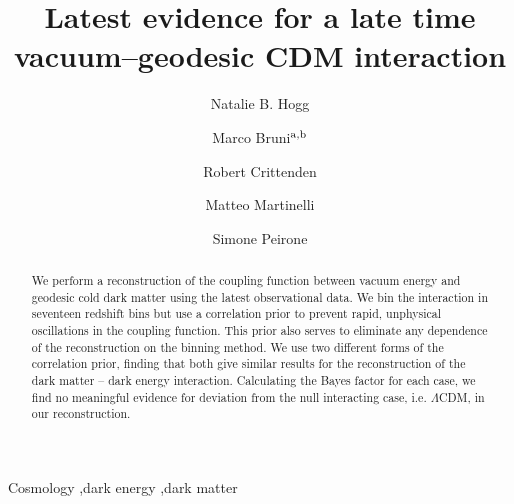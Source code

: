 \documentclass[final,3p,times,twocolumn]{elsarticle}
\begin{document}
\begin{frontmatter}

\title{Latest evidence for a late time vacuum--geodesic CDM interaction}

\author[ICG]{Natalie B. Hogg }
\author{Marco Bruni$^{\rm a, b}$}
\author[ICG]{Robert Crittenden}
\author[IFT]{Matteo Martinelli}
\author[Leiden]{Simone Peirone}

\address[ICG]{Institute  of  Cosmology  and  Gravitation,  University  of  Portsmouth, Burnaby  Road,  Portsmouth  PO1  3FX, United Kingdom}
\address[INFN]{INFN Sezione di Trieste, Via Valerio 2, 34127 Trieste, Italy}
\address[IFT]{Instituto de F\'isica T\'eorica UAM-CSIC, Campus de Cantoblanco, E-28049 Madrid, Spain}
\address[Leiden]{Institute Lorentz, Leiden University, PO Box 9506, Leiden 2300 RA, The Netherlands }


\begin{abstract}
We perform a reconstruction of the coupling function between vacuum energy and geodesic cold dark matter using the latest observational data. We bin the interaction in seventeen redshift bins but use a correlation prior to prevent rapid, unphysical oscillations in the coupling function. This prior also serves to eliminate any dependence of the reconstruction on the binning method. We use two different forms of the correlation prior, finding that both give similar results for the reconstruction of the dark matter -- dark energy interaction. Calculating the Bayes factor for each case, we find no meaningful evidence for deviation from the null interacting case, i.e. $\Lambda$CDM, in our reconstruction.
\end{abstract}

\begin{keyword}
Cosmology \sep dark energy \sep dark matter


\end{keyword}

\end{frontmatter}

\end{document}
